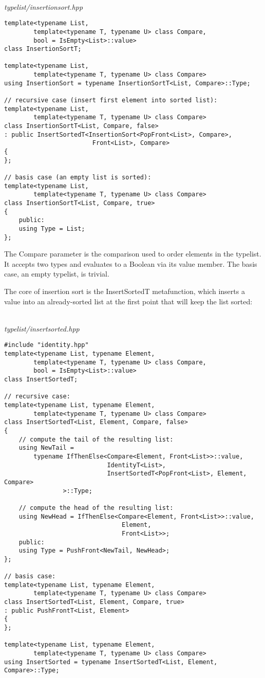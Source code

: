 \hspace*{\fill} \\ %
\noindent
\textit{typelist/insertionsort.hpp}
\begin{lstlisting}[style=styleCXX]
template<typename List,
		template<typename T, typename U> class Compare,
		bool = IsEmpty<List>::value>
class InsertionSortT;

template<typename List,
		template<typename T, typename U> class Compare>
using InsertionSort = typename InsertionSortT<List, Compare>::Type;

// recursive case (insert first element into sorted list):
template<typename List,
		template<typename T, typename U> class Compare>
class InsertionSortT<List, Compare, false>
: public InsertSortedT<InsertionSort<PopFront<List>, Compare>,
						Front<List>, Compare>
{
};

// basis case (an empty list is sorted):
template<typename List,
		template<typename T, typename U> class Compare>
class InsertionSortT<List, Compare, true>
{
	public:
	using Type = List;
};
\end{lstlisting}

The Compare parameter is the comparison used to order elements in the typelist. It accepts two types and evaluates to a Boolean via its value member. The basis case, an empty typelist, is trivial.

The core of insertion sort is the InsertSortedT metafunction, which inserts a value into an already-sorted list at the first point that will keep the list sorted:

\hspace*{\fill} \\ %
\noindent
\textit{typelist/insertsorted.hpp}
\begin{lstlisting}[style=styleCXX]
#include "identity.hpp"
template<typename List, typename Element,
		template<typename T, typename U> class Compare,
		bool = IsEmpty<List>::value>
class InsertSortedT;

// recursive case:
template<typename List, typename Element,
		template<typename T, typename U> class Compare>
class InsertSortedT<List, Element, Compare, false>
{
	// compute the tail of the resulting list:
	using NewTail =
		typename IfThenElse<Compare<Element, Front<List>>::value,
							IdentityT<List>,
							InsertSortedT<PopFront<List>, Element, Compare>
				>::Type;
				
	// compute the head of the resulting list:
	using NewHead = IfThenElse<Compare<Element, Front<List>>::value,
								Element,
								Front<List>>;
	public:
	using Type = PushFront<NewTail, NewHead>;
};

// basis case:
template<typename List, typename Element,
		template<typename T, typename U> class Compare>
class InsertSortedT<List, Element, Compare, true>
: public PushFrontT<List, Element>
{
};

template<typename List, typename Element,
		template<typename T, typename U> class Compare>
using InsertSorted = typename InsertSortedT<List, Element, Compare>::Type;
\end{lstlisting}

